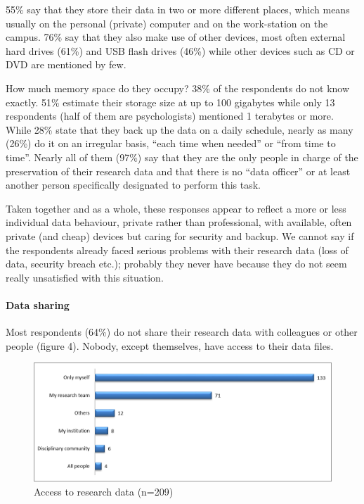 \documentclass[a4paper,
fontsize=11pt,
oneside,
numbers=noperiodatend,
parskip=half-,
bibliography=totoc,
final
]{scrartcl}
\begin{document}
55\% say that they store their data in two or more different places,
which means usually on the personal (private) computer and on the
work-station on the campus. 76\% say that they also make use of other
devices, most often external hard drives (61\%) and USB flash drives
(46\%) while other devices such as CD or DVD are mentioned by few.

How much memory space do they occupy? 38\% of the respondents do not
know exactly. 51\% estimate their storage size at up to 100 gigabytes
while only 13 respondents (half of them are psychologists) mentioned 1
terabytes or more. While 28\% state that they back up the data on a
daily schedule, nearly as many (26\%) do it on an irregular basis,
\enquote{each time when needed} or \enquote{from time to time}. Nearly
all of them (97\%) say that they are the only people in charge of the
preservation of their research data and that there is no \enquote{data
officer} or at least another person specifically designated to perform
this task.

Taken together and as a whole, these responses appear to reflect a more
or less individual data behaviour, private rather than professional,
with available, often private (and cheap) devices but caring for
security and backup. We cannot say if the respondents already faced
serious problems with their research data (loss of data, security breach
etc.); probably they never have because they do not seem really
unsatisfied with this situation.

\paragraph{Data sharing}\label{data-sharing}

Most respondents (64\%) do not share their research data with colleagues
or other people (figure 4). Nobody, except themselves, have access to
their data files.

\begin{figure}[htbp]
\centering
\includegraphics{figures/media/image4.png}
\caption{Access to research data (n=209)}
\end{figure}
\end{document}
